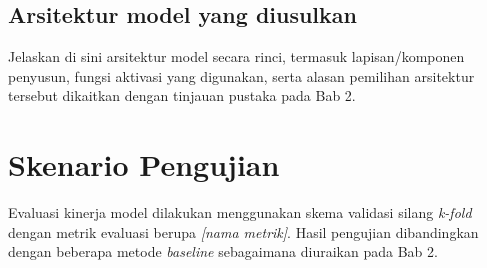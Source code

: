 \subsection{Arsitektur model yang diusulkan}
Jelaskan di sini arsitektur model secara rinci, termasuk lapisan/komponen penyusun, fungsi aktivasi yang digunakan, serta alasan pemilihan arsitektur tersebut dikaitkan dengan tinjauan pustaka pada Bab 2.

\section{Skenario Pengujian}
Evaluasi kinerja model dilakukan menggunakan skema validasi silang \textit{k-fold} dengan metrik evaluasi berupa \textit{[nama metrik]}. Hasil pengujian dibandingkan dengan beberapa metode \textit{baseline} sebagaimana diuraikan pada Bab 2.

